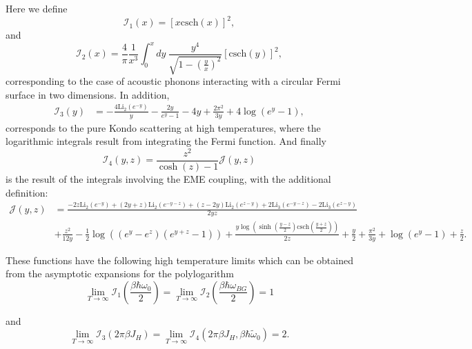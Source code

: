 \documentclass[aps,prl,twocolumn,superscriptaddress,amsmath,nofootinbib,10pt,floatfix]{revtex4-2}
\begin{document}
\begin{widetext}
Here we define
\begin{equation}
\mathcal{I}_{1}\left(x\right)=\left[x\text{csch}\left(x\right)\right]^{2},
\label{def_of_K}
\end{equation}
and
\begin{equation}
\mathcal{I}_{2}\left(x\right)=\frac{4}{\pi}\frac{1}{x^{3}}\int_{0}^{x}dy\ \frac{y^{4}}{\sqrt{1-\left(\frac{y}{x}\right)^{2}}}\left[\text{csch}\left(y\right)\right]^{2},
\end{equation}
corresponding to the case of acoustic phonons
interacting with a circular
Fermi surface in two dimensions. In addition,
\begin{align}
\mathcal{I}_{3}\left(y\right) & =-\frac{4\text{Li}_{2}\left(e^{-y}\right)}{y}-\frac{2y}{e^{y}-1}-4y+\frac{2\pi^{2}}{3y}+4\log\left(e^{y}-1\right),
\end{align}
corresponds to the pure Kondo scattering at high temperatures, where the logarithmic integrals result from integrating the Fermi function.
And finally 
\begin{equation}
\mathcal{I}_{4}\left(y,z\right)=\frac{z^{2}}{\cosh\left(z\right)-1}\mathcal{J}\left(y,z\right)
\end{equation}
is the result of the integrals involving the EME coupling, with the
additional definition:
\begin{align}
\mathcal{J}\left(y,z\right) & =\frac{-2z\text{Li}_{2}\left(e^{-y}\right)+\left(2y+z\right)\text{Li}_{2}\left(e^{-y-z}\right)+\left(z-2y\right)\text{Li}_{2}\left(e^{z-y}\right)+2\text{Li}_{3}\left(e^{-y-z}\right)-2\text{Li}_{3}\left(e^{z-y}\right)}{2yz} \nonumber \\
 & +\frac{z^{2}}{12y}-\frac{1}{2}\log\left(\left(e^{y}-e^{z}\right)\left(e^{y+z}-1\right)\right)+\frac{y\log\left(\sinh\left(\frac{y-z}{2}\right)\text{csch}\left(\frac{y+z}{2}\right)\right)}{2z}+\frac{y}{2}+\frac{\pi^{2}}{3y}+\log\left(e^{y}-1\right)+\frac{z}{2}.
\end{align}

These functions have the following high temperature limits which can
be obtained from the asymptotic expansions for the polylogarithm
\begin{equation}
\lim_{T\rightarrow\infty}\mathcal{I}_{1}\left(\frac{\beta\hbar\omega_{0}}{2}\right)=\lim_{T\rightarrow\infty}\mathcal{I}_{2}\left(\frac{\beta\hbar\omega_{BG}}{2}\right)=1
\end{equation}

and 
\begin{equation}
\lim_{T\rightarrow\infty}\mathcal{I}_{3}\left(2\pi\beta J_{H}\right)=\lim_{T\rightarrow\infty}\mathcal{I}_{4}\left(2\pi\beta J_{H},\beta\hbar\tilde{\omega}_{0}\right)=2.
\end{equation}


\end{widetext}
\end{document}
